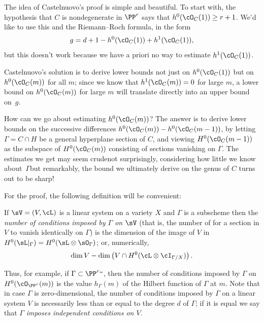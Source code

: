 The idea of Castelnuovo's proof is simple and beautiful. To start
with, the hypothesis that $C$ is nondegenerate in $\PP^r$ says that
$h^0(\cO_C(1)) \geq r+1$. We'd like to use this and the Riemann--Roch
formula, in the form
$$
g = d+1 - h^0(\cO_C(1)) + h^1(\cO_C(1)),
$$
but this doesn't work because we have a priori no way to estimate
$h^1(\cO_C(1))$.

Castelnuovo's solution  is to derive lower bounds not just on
$h^0(\cO_C(1))$ but on $h^0(\cO_C(m))$ for all $m$; since we know that
$h^1(\cO_C(m)) = 0$ for large $m$, a lower bound on $h^0(\cO_C(m))$
for large $m$ will translate directly into an upper bound on~$g$.

How can we go about estimating $h^0(\cO_C(m))$? The answer is to
derive lower bounds on the successive differences $h^0(\cO_C(m)) -
h^0(\cO_C(m-1))$, by letting $\Gamma = C \cap H$ be a general hyperplane
section of $C$, and viewing $H^0(\cO_C(m-1))$ as the subspace of
$H^0(\cO_C(m))$ consisting of sections vanishing on $\Gamma$. The
estimates we get may seem crude\emdash not surprisingly, considering
how little we know about~$\Gamma$\emdash but remarkably, the bound we
ultimately derive on the genus of $C$ turns out to be sharp!

For the proof, the following definition will be convenient:

\begin{definition}
If $\sV = (V,\cL)$ is a linear system on a variety $X$ and $\Gamma$
is a subscheme then the \emph{number of conditions imposed by $\Gamma$
%
on $\sV$} (that is, the number of 
%
for a
section in $V$ to vanish
identically on $\Gamma$) is the dimension of the image of $V$ in
$H^0(\sL|_\Gamma) = H^0(\sL \otimes \sO_\Gamma)$; or, numerically,
$$
\dim V - \dim \left(V \cap H^0(\cL\otimes \cI_{\Gamma/X}) \right).
$$
\end{definition}

Thus, for example, if $\Gamma \subset \PP^r` `$, then the number of
conditions imposed by $\Gamma$ on $H^0(\cO_{\PP^r}(m))$ is the value
$h_\Gamma(m)$ of the Hilbert function of $\Gamma$ at $m$.
Note that in case $\Gamma$ is zero-dimensional, the number of conditions
imposed by $\Gamma$ on a linear system $V$ is necessarily less than or
equal to the degree $d$ of $\Gamma$; if it is equal we say that $\Gamma$
\emph{imposes independent conditions on $V$}.

